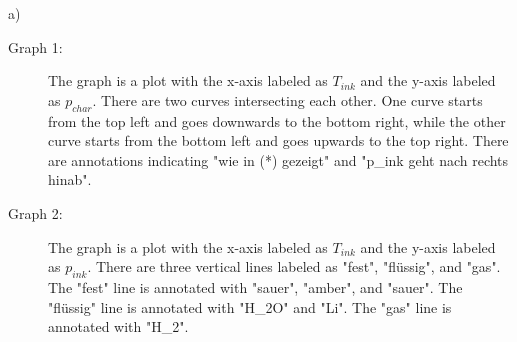 a)

\begin{description}
    \item[Graph 1:] The graph is a plot with the x-axis labeled as $T_{ink}$ and the y-axis labeled as $p_{char}$. There are two curves intersecting each other. One curve starts from the top left and goes downwards to the bottom right, while the other curve starts from the bottom left and goes upwards to the top right. There are annotations indicating "wie in (*) gezeigt" and "p_{ink} geht nach rechts hinab".
    \item[Graph 2:] The graph is a plot with the x-axis labeled as $T_{ink}$ and the y-axis labeled as $p_{ink}$. There are three vertical lines labeled as "fest", "flüssig", and "gas". The "fest" line is annotated with "sauer", "amber", and "sauer". The "flüssig" line is annotated with "H_2O" and "Li". The "gas" line is annotated with "H_2".
\end{description}